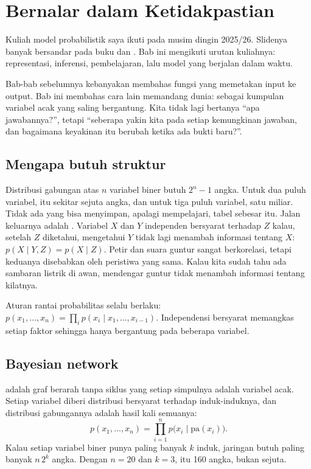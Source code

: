 \chapter{Bernalar dalam Ketidakpastian}
\label{ch:prob}

Kuliah model probabilistik saya ikuti pada musim dingin 2025/26. Slidenya banyak bersandar pada
buku \citet{koller2009} dan \citet{russell2021}. Bab ini mengikuti urutan kuliahnya: representasi,
inferensi, pembelajaran, lalu model yang berjalan dalam waktu.

Bab-bab sebelumnya kebanyakan membahas fungsi yang memetakan input ke output. Bab ini membahas cara
lain memandang dunia: sebagai kumpulan variabel acak yang saling bergantung. Kita tidak lagi
bertanya ``apa jawabannya?'', tetapi ``seberapa yakin kita pada setiap kemungkinan jawaban, dan
bagaimana keyakinan itu berubah ketika ada bukti baru?''.

\section{Mengapa butuh struktur}

Distribusi gabungan atas $n$ variabel biner butuh $2^n-1$ angka. Untuk dua puluh variabel, itu
sekitar sejuta angka, dan untuk tiga puluh variabel, satu miliar. Tidak ada yang bisa menyimpan,
apalagi mempelajari, tabel sebesar itu. Jalan keluarnya adalah .
Variabel $X$ dan $Y$ independen bersyarat terhadap $Z$ kalau, setelah $Z$ diketahui, mengetahui $Y$
tidak lagi menambah informasi tentang $X$: $p(X\mid Y,Z)=p(X\mid Z)$. Petir dan suara guntur sangat
berkorelasi, tetapi keduanya disebabkan oleh peristiwa yang sama. Kalau kita sudah tahu ada sambaran
listrik di awan, mendengar guntur tidak menambah informasi tentang kilatnya.

Aturan rantai probabilitas selalu berlaku: $p(x_1,\dots,x_n)=\prod_ip(x_i\mid x_1,\dots,x_{i-1})$.
Independensi bersyarat memangkas setiap faktor sehingga hanya bergantung pada beberapa variabel.

\section{Bayesian network}

 adalah graf berarah tanpa siklus yang setiap simpulnya adalah variabel acak.
Setiap variabel diberi distribusi bersyarat terhadap induk-induknya, dan distribusi gabungannya
adalah hasil kali semuanya:
\begin{equation}
p(x_1,\dots,x_n)=\prod_{i=1}^n p\big(x_i\mid\mathrm{pa}(x_i)\big).
\end{equation}
Kalau setiap variabel biner punya paling banyak $k$ induk, jaringan butuh paling banyak $n\,2^k$
angka. Dengan $n=20$ dan $k=3$, itu 160 angka, bukan sejuta.

